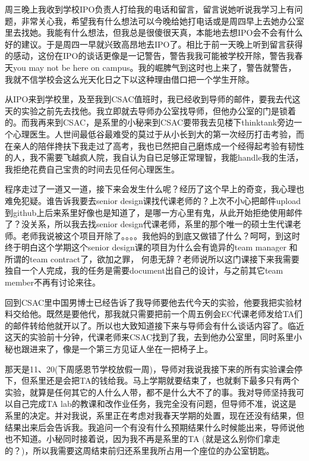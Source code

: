 \documentclass[12pt]{book}
\begin{document}
周三晚上我收到学校IPO负责人打给我的电话和留言，留言说她听说我学习上有问题，非常关心我，希望我有什么想法可以今晚给她打电话或是周四早上去她办公室里去找她。我能有什么想法，但我总是很傻很天真，本能地去想IPO会不会有什么好的建议。于是周四一早就兴致高昂地去IPO了。相比于前一天晚上听到留言获得的感动，这份在IPO的谈话更像是一记警告，警告我我可能被学校开除，警告我春天you may not be here on campus。我的崛脾气到这时也上来了，警告就警告，我就不信学校会这么光天化日之下以这种理由借口把一个学生开除。

从IPO来到学校里，及至我到CSAC值班时，我已经收到导师的邮件，要我去代这天的实验之前先去找他。我立即就去导师办公室找导师，但他办公室的门是锁着的。而我再来到CSAC，是系里的小秘来到CSAC要带我去见楼下thinktank旁边一个心理医生。人世间最低谷最难受的莫过于从小长到大的第一次经历打击考验，而在亲人的陪伴搀扶下我走过了高考，我也已然把自己磨炼成一个经得起考验有韧性的人，我不需要飞越疯人院，我自认为自已足够正常理智，我能handle我的生活，我拒绝花费自己宝贵的时间去见任何心理医生。

程序走过了一道又一道，接下来会发生什么呢？经历了这个早上的奇变，我心理也难免犯疑。谁告诉我要去senior design课找代课老师的？上次不小心把邮件upload到github上后来系里好像也是知道了，是哪一方心里有鬼，从此开始拒绝使用邮件了？没关系，所以我去找senior design代课老师，系里的那个唯一的硕士生代课老师。老师我说被这个项目开除了。。。。我他妈的到底又做错了什么？呵呵，到这时终于明白这个学期这个senior design课的项目为什么会有诡异的team manager 和所谓的team contract了，欲加之罪， 何患无辞？老师说所以这门课接下来我需要独自一个人完成，我的任务是需要document出自己的设计，与之前其它team member不再有讨论来往。

回到CSAC里中国男博士已经告诉了我导师要他去代今天的实验，他要我把实验材料交给他。既然是要他代，那我就只需要把前一个周五例会EC代课老师发给TA们的邮件转给他就开以了。所以也大致知道接下来与导师会有什么谈话内容了。临近这天的实验前十分钟，代课老师来CSAC找到了我，去到他办公室里，同时系里小秘也跟进来了，像是一个第三方见证人坐在一把椅子上。

那天是11、20(下周感恩节学校放假一周)，导师对我说我接下来的所有实验课会停下，但系里还是会把TA的钱给我。马上学期就要结束了，也就剩下最多只有两个实验，就算是任何其它的人什么人带，都不是什么大不了的事。我对导师坚持我可以自己完成TA lab的教课和改作业任务，我完全没有问题，但导师不准，说这是系里的决定。并对我说，系里正在考虑对我春天学期的处置，现在还没有结果，但结果出来后会告诉我。我追问一个有没有什么预期结果什么时候能出来，导师说他也不知道。小秘同时接着说，因为我不再是系里的TA (就是这么别你们拿走的？)，所以我需要这周结束前归还系里我所占用一个座位的办公室钥匙。
\end{document}
